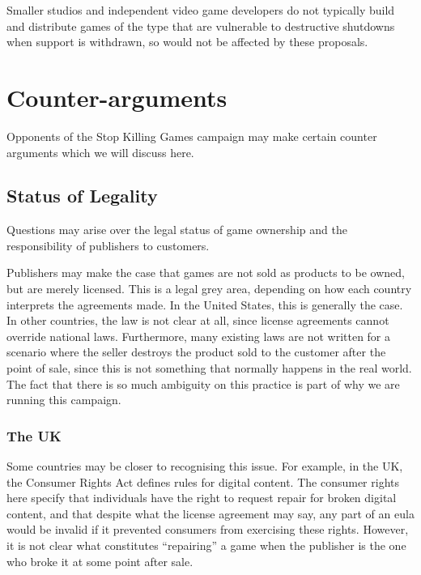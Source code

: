 Smaller studios and independent video game developers do not typically build and distribute games of the type that are vulnerable to destructive shutdowns when support is withdrawn,
so would not be affected by these proposals.


\section{Counter-arguments}
Opponents of the Stop Killing Games campaign may make certain counter arguments which we will discuss here.

\subsection{Status of Legality}
Questions may arise over the legal status of game ownership and the responsibility of publishers to customers.

Publishers may make the case that games are not sold as products to be owned, but are merely licensed.
This is a legal grey area, depending on how each country interprets the agreements made.
In the United States, this is generally the case\cn.
In other countries, the law is not clear at all, since license agreements cannot override national laws.
Furthermore, many existing laws are not written for a scenario where the seller destroys the product sold to the customer after the point of sale,
since this is not something that normally happens in the real world.
The fact that there is so much ambiguity on this practice is part of why we are running this campaign.

\subsubsection{The UK}
Some countries may be closer to recognising this issue.
For example, in the UK, the Consumer Rights Act defines rules for digital content\cite{cra-digital-2015}.
The consumer rights here specify that individuals have the right to request repair for broken digital content,
and that despite what the license agreement may say, any part of an \gls{eula} would be invalid if it prevented consumers from exercising these rights.
However, it is not clear what constitutes ``repairing'' a game when the publisher is the one who broke it at some point after sale.




